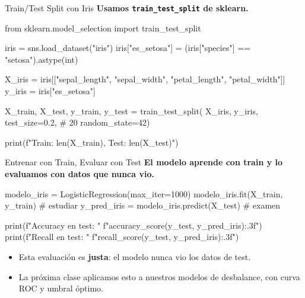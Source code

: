 \documentclass[aspectratio=169, 11pt]{beamer}
\begin{document}
\begin{frame}[fragile,shrink=28]{Train/Test Split con Iris}
  \vspace{-6pt}
  {\footnotesize\color{arcaDark}\bfseries
    Usamos \texttt{train\_test\_split} de sklearn.}

  \vspace{4pt}
  \begin{pyblock}
from sklearn.model_selection import train_test_split

iris = sns.load_dataset("iris")
iris["es_setosa"] = (iris["species"] == "setosa").astype(int)

X_iris = iris[["sepal_length", "sepal_width",
               "petal_length", "petal_width"]]
y_iris = iris["es_setosa"]

X_train, X_test, y_train, y_test = train_test_split(
    X_iris, y_iris,
    test_size=0.2,       # 20%
    random_state=42)

print(f"Train: {len(X_train)}, Test: {len(X_test)}")
  \end{pyblock}
\end{frame}

\begin{frame}[fragile,shrink=28]{Entrenar con Train, Evaluar con Test}
  \vspace{-6pt}
  {\footnotesize\color{arcaDark}\bfseries
    El modelo aprende con train y lo evaluamos con datos que
    \textbf{nunca vio}.}

  \vspace{4pt}
  \begin{pyblock}
modelo_iris = LogisticRegression(max_iter=1000)
modelo_iris.fit(X_train, y_train)      # estudiar
y_pred_iris = modelo_iris.predict(X_test)  # examen

print(f"Accuracy en test: "
      f"{accuracy_score(y_test, y_pred_iris):.3f}")
print(f"Recall en test:   "
      f"{recall_score(y_test, y_pred_iris):.3f}")
  \end{pyblock}

  \vspace{4pt}
  {\scriptsize\color{textMuted}
  \begin{itemize}\setlength{\itemsep}{3pt}
    \item[{\color{codeGreen}\scriptsize\faCheckCircle}]
      Esta evaluación es \textbf{justa}: el modelo nunca
      vio los datos de test.
    \item[{\color{arcaRed}\scriptsize\faArrowRight}]
      La próxima clase aplicamos esto a nuestros modelos
      de desbalance, con curva ROC y umbral óptimo.
  \end{itemize}
  }
\end{frame}
\end{document}
